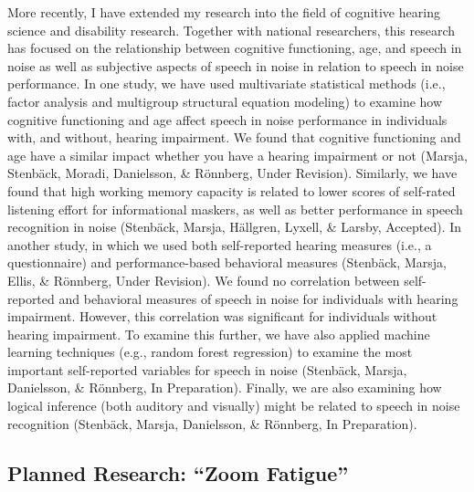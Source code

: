 \documentclass[]{article}
\begin{document}
More recently, I have extended my research into the field of cognitive
hearing science and disability research. Together with national
researchers, this research has focused on the relationship between
cognitive functioning, age, and speech in noise as well as subjective
aspects of speech in noise in relation to speech in noise performance.
In one study, we have used multivariate statistical methods (i.e.,
factor analysis and multigroup structural equation modeling) to examine
how cognitive functioning and age affect speech in noise performance in
individuals with, and without, hearing impairment. We found that
cognitive functioning and age have a similar impact whether you have a
hearing impairment or not (Marsja, Stenbäck, Moradi, Danielsson, \&
Rönnberg, Under Revision). Similarly, we have found that high working
memory capacity is related to lower scores of self-rated listening
effort for informational maskers, as well as better performance in
speech recognition in noise (Stenbäck, Marsja, Hällgren, Lyxell, \&
Larsby, Accepted). In another study, in which we used both self-reported
hearing measures (i.e., a questionnaire) and performance-based
behavioral measures (Stenbäck, Marsja, Ellis, \& Rönnberg, Under
Revision). We found no correlation between self-reported and behavioral
measures of speech in noise for individuals with hearing impairment.
However, this correlation was significant for individuals without
hearing impairment. To examine this further, we have also applied
machine learning techniques (e.g., random forest regression) to examine
the most important self-reported variables for speech in noise
(Stenbäck, Marsja, Danielsson, \& Rönnberg, In Preparation). Finally, we
are also examining how logical inference (both auditory and visually)
might be related to speech in noise recognition (Stenbäck, Marsja,
Danielsson, \& Rönnberg, In Preparation).

\hypertarget{planned-research-zoom-fatigue}{%
\subsection{Planned Research: ``Zoom
Fatigue''}\label{planned-research-zoom-fatigue}}
\end{document}
